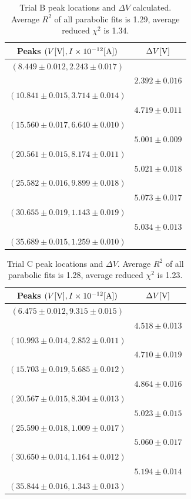 \documentclass[12pt]{article}
\begin{document}
\begin{table}[h!]
    \centering
    \caption{\centering Trial B peak locations and \(\Delta V\) calculated. Average $R^2$ of all parabolic fits is 1.29, average reduced $\chi^2$ is 1.34.}
    \begin{tabular}{cc}
        \toprule
        Peaks $(V [{\rm V}], I \times10^{-12}[{\rm A}])$ & $\Delta V{\rm [V]}$ \\
        \midrule
        $(8.449 \pm 0.012, 2.243 \pm 0.017)$ & \\
        & $2.392 \pm 0.016$ \\
        $(10.841 \pm 0.015, 3.714 \pm 0.014)$ & \\
        & $4.719 \pm 0.011$ \\
        $(15.560 \pm 0.017, 6.640 \pm 0.010)$ & \\
        & $5.001 \pm 0.009$ \\
        $(20.561 \pm 0.015, 8.174 \pm 0.011)$ & \\
        & $5.021 \pm 0.018$ \\
        $(25.582 \pm 0.016, 9.899 \pm 0.018)$ & \\
        & $5.073 \pm 0.017$ \\
        $(30.655 \pm 0.019, 1.143 \pm 0.019)$ & \\
        & $5.034 \pm 0.013$ \\
        $(35.689 \pm 0.015, 1.259 \pm 0.010)$ & \\
        \bottomrule
    \end{tabular}
    \label{table:B_peaks}
\end{table}



\begin{table}[h!]
    \centering
        \caption{\centering Trial C peak locations and $\Delta V$. Average $R^2$ of all parabolic fits is 1.28, average reduced $\chi^2$ is 1.23.}    
    \begin{tabular}{cc}
        \toprule
        Peaks $(V [{\rm V}], I \times10^{-12}[{\rm A}])$ & $\Delta V{\rm [V]}$ \\
        \midrule
$(6.475 \pm 0.012, 9.315 \pm 0.015)$ & \\
& $4.518 \pm 0.013$ \\
$(10.993 \pm 0.014, 2.852 \pm 0.011)$ & \\
& $4.710 \pm 0.019$ \\
$(15.703 \pm 0.019, 5.685 \pm 0.012)$ & \\
& $4.864 \pm 0.016$ \\
$(20.567 \pm 0.015, 8.304 \pm 0.013)$ & \\
& $5.023 \pm 0.015$ \\
$(25.590 \pm 0.018, 1.009 \pm 0.017)$ & \\
& $5.060 \pm 0.017$ \\
$(30.650 \pm 0.014, 1.164 \pm 0.012)$ & \\
& $5.194 \pm 0.014$ \\
$(35.844 \pm 0.016, 1.343 \pm 0.013)$ & \\
        \bottomrule
    \end{tabular}
    \label{table:C_peaks}
\end{table}
\end{document}
